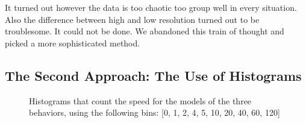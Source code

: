 It turned out however the data is too chaotic too group well in every situation. 
Also the difference between high and low resolution turned out to be troublesome. It
could not be done. We abandoned this train of thought and picked a more sophisticated 
method.




\subsection{The Second Approach: The Use of Histograms}
\begin{figure}
  \centering
  \caption{Histograms that count the speed for the models of the three
  behaviors, using the following bins: [0, 1, 2, 4, 5, 10, 20, 40, 60, 120]}
  \label{fig:modelHistogramsSpeed}
\end{figure}
